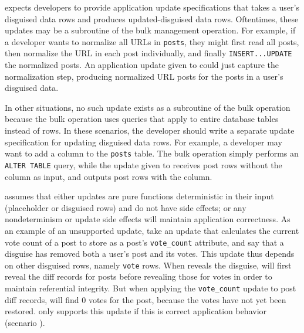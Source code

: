 %

%
\sys expects developers to provide application update specifications that takes
a user's disguised data rows and produces updated-disguised data rows.
%
Oftentimes, these updates may be a subroutine of the bulk management operation. 
%
For example, if a developer wants to normalize all URLs in \texttt{posts}, they
might first read all posts, then normalize the URL in each post individually,
and finally \texttt{INSERT...UPDATE} the normalized posts. 
%
An application update given to \sys could just capture the normalization step,
producing normalized URL posts for the posts in a user's disguised data.
%

%
In other situations, no such update exists as a subroutine of the bulk operation
because the bulk operation uses queries that apply to entire database tables
instead of rows. In these scenarios, the developer should write a separate
update specification for updating disguised data rows.
%
For example, a developer may want to add a column to the \texttt{posts} table.
The bulk operation simply performs an \texttt{ALTER TABLE} query, while the
update given to \sys receives post rows without the column as input, and outputs
post rows with the column.
%

%
\sys assumes that either \one{} updates are pure functions deterministic in
their input (placeholder or disguised rows) and do not have side effects; or
\two{} any nondeterminism or update side effects will maintain application
correctness.
%
As an example of an unsupported update, take an update that calculates the
current vote count of a post to store as a post's \texttt{vote\_count}
attribute, and say that a disguise has removed both a user's post and its votes.
%
This update thus depends on other disguised rows, namely \texttt{vote} rows.
%
When \sys reveals the disguise, \sys will first reveal the diff records for
posts before revealing those for votes in order to maintain referential
integrity. But when applying the \texttt{vote\_count} update to post diff
records, \sys will find 0 votes for the post, because the votes have not yet
been restored.
%
\sys only supports this update if this is correct application behavior (scenario
\two{}).
%


